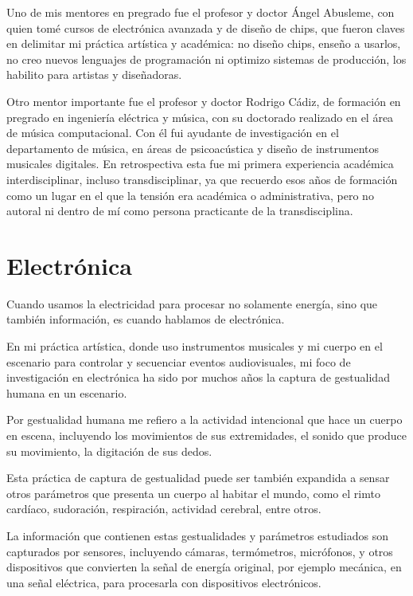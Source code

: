 \documentclass{article}
\begin{document}
Uno de mis mentores en pregrado fue el profesor y doctor Ángel Abusleme, con quien tomé cursos de electrónica avanzada y de diseño de chips, que fueron claves en delimitar mi práctica artística y académica: no diseño chips, enseño a usarlos, no creo nuevos lenguajes de programación ni optimizo sistemas de producción, los habilito para artistas y diseñadoras.

Otro mentor importante fue el profesor y doctor Rodrigo Cádiz, de formación en pregrado en ingeniería eléctrica y música, con su doctorado realizado en el área de música computacional. Con él fui ayudante de investigación en el departamento de música, en áreas de psicoacústica y diseño de instrumentos musicales digitales. En retrospectiva esta fue mi primera experiencia académica interdisciplinar, incluso transdisciplinar, ya que recuerdo esos años de formación como un lugar en el que la tensión era académica o administrativa, pero no autoral ni dentro de mí como persona practicante de la transdisciplina.

\clearpage

\section{Electrónica}

Cuando usamos la electricidad para procesar no solamente energía, sino que también información, es cuando hablamos de electrónica.

En mi práctica artística, donde uso instrumentos musicales y mi cuerpo en el escenario para controlar y secuenciar eventos audiovisuales, mi foco de investigación en electrónica ha sido por muchos años la captura de gestualidad humana en un escenario.

Por gestualidad humana me refiero a la actividad intencional que hace un cuerpo en escena, incluyendo los movimientos de sus extremidades, el sonido que produce su movimiento, la digitación de sus dedos.

Esta práctica de captura de gestualidad puede ser también expandida a sensar otros parámetros que presenta un cuerpo al habitar el mundo, como el rimto cardíaco, sudoración, respiración, actividad cerebral, entre otros.

La información que contienen estas gestualidades y parámetros estudiados son capturados por sensores, incluyendo cámaras, termómetros, micrófonos, y otros dispositivos que convierten la señal de energía original, por ejemplo mecánica, en una señal eléctrica, para procesarla con dispositivos electrónicos.
\end{document}
